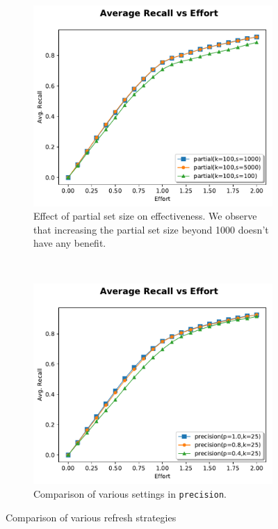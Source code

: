 \begin{figure}
    \begin{subfigure}[t]{0.48\textwidth}
        \centering
        \includegraphics[width=\textwidth]{plots/partial2.pdf}
        \caption{Effect of partial set size on effectiveness. We observe that
        increasing the partial set size beyond 1000 doesn't have any benefit.}
        \label{plot:partial2}
    \end{subfigure}
    ~
    \begin{subfigure}[t]{0.48\textwidth}
        \centering
        \includegraphics[width=\textwidth]{plots/precision.pdf}
        \caption{Comparison of various settings in \texttt{precision}.}
        \label{plot:prec}
    \end{subfigure}
    \caption{Comparison of various refresh strategies}
\end{figure}


